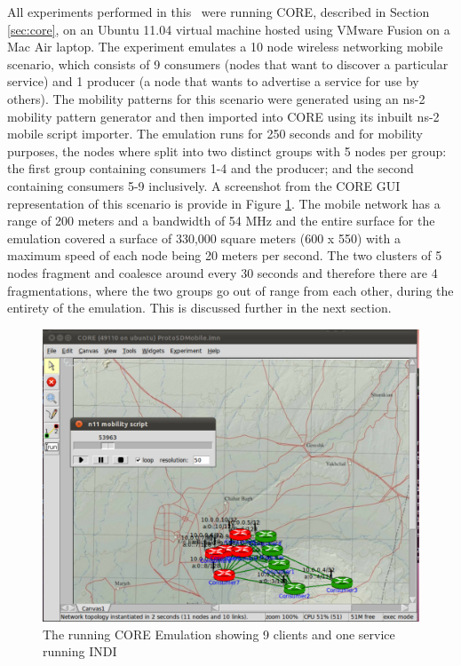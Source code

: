 
All experiments performed in this \doctype~were running CORE, described in Section \ref{sec:core}, on an Ubuntu 11.04 virtual machine hosted using VMware Fusion on a Mac Air laptop. The experiment emulates a 10 node wireless networking mobile scenario, which consists of 9 consumers (nodes that want to discover a particular service) and 1 producer (a node that wants to advertise a service for use by others).   The mobility patterns for this scenario were generated using an ns-2 mobility pattern generator and then imported into CORE using its inbuilt ns-2 mobile script importer. The emulation runs for 250 seconds and for mobility purposes, the nodes where split into two distinct groups with 5 nodes per group: the first group containing consumers 1-4 and the producer; and the second containing consumers 5-9 inclusively. A screenshot from the CORE GUI representation of this scenario is provide in Figure \ref{indi:fig:core}. The mobile network has a range of 200 meters and a bandwidth of 54 MHz and the entire surface for the emulation covered a surface of  330,000 square meters (600 x 550) with a maximum speed of each node being 20 meters per second. The two clusters of 5 nodes fragment and coalesce around every 30 seconds and therefore there are 4 fragmentations, where the two groups go out of range from each other, during the entirety of the emulation.  This is discussed further in the next section.

\begin{figure}[h!]
\centering
\includegraphics[scale=0.45]{COREEmulation.pdf}
\caption{The running CORE Emulation showing 9 clients and one service running INDI} 
\label{indi:fig:core}
\end{figure}


